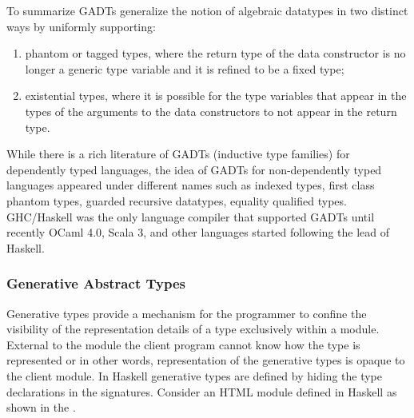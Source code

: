 \documentclass[screen,nonacm]{acmart}
\begin{document}
To summarize GADTs generalize the notion of algebraic datatypes in two
distinct ways by uniformly supporting:
\begin{enumerate}
\item phantom or tagged types, where the return type of the data
  constructor is no longer a generic type variable and it is refined
  to be a fixed type;
\item existential types, where it is possible for the type variables
  that appear in the types of the arguments to the data
  constructors to not appear in the return type.
\end{enumerate}

While there is a rich literature of GADTs (inductive type families)
for dependently typed languages\cite{dybjer_inductive_1991,
  dybjer_inductive_1994}, the idea of GADTs for non-dependently typed
languages appeared under different names such as indexed
types\cite{zenger_indexed_1997}, first class phantom
types\cite{cheney_first-class_2003}, guarded recursive
datatypes\cite{xi_guarded_2003}, equality qualified
types\cite{sheard_meta-programming_2008}. GHC/Haskell was the only
language compiler that supported GADTs\cite{peyton_jones_wobbly_2004}
until recently OCaml 4.0\cite{garrigue_gadt_2011}, Scala 3\cite{xu_implementing_2021},
and other languages started following the lead of Haskell.


\subsubsection{Generative Abstract Types}\label{subsubsec:gen-abs-types}
Generative types provide a mechanism for the programmer to confine the
visibility of the representation details of a type
exclusively within a module. External to the module the client program
cannot know how the type is represented or in other words,
representation of the generative types is opaque to the client
module. In Haskell generative types are defined by hiding the type
declarations in the signatures. Consider an HTML module defined in
Haskell as shown in the .
\end{document}
